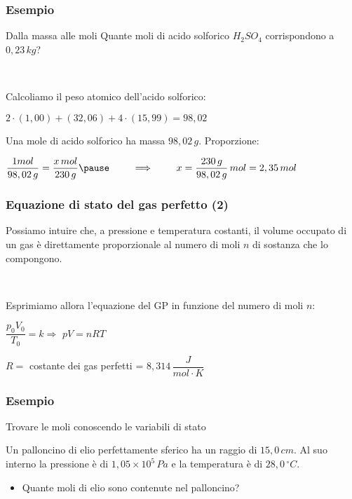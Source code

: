 \documentclass[]{beamer}
\theoremstyle{plain}
\begin{document}
\begin{frame}
\frametitle{Esempio}
\begin{exampleblock}{Dalla massa alle moli}
{\small Quante moli di acido solforico $ H_2SO_4 $ corrispondono a $ 0,23 \, kg $?}
\end{exampleblock}\pause

~

Calcoliamo il peso atomico dell'acido solforico:
\begin{center}
$ 2 \cdot (1,00) + (32,06) + 4 \cdot (15,99) = 98,02 $
\end{center}
Una mole di acido solforico ha massa $ 98,02 \, g $.{\pause} Proporzione:
\begin{center}
$ \dfrac{1 mol}{98,02 \, g} = \dfrac{x \, mol}{230 \, g} \pause ~~~~~~~ \Longrightarrow ~~~~~~~ x = \dfrac{230\, g}{98,02 \, g} \, mol = 2,35 \, mol $
\end{center}
\end{frame}

\begin{frame}
\frametitle{Equazione di stato del gas perfetto (2)}
Possiamo intuire che, a pressione e temperatura costanti, \alert<1>{il volume occupato di un gas è direttamente proporzionale al numero di moli} $ n $ di sostanza che lo compongono.\pause

~

Esprimiamo allora l'equazione del GP in funzione del numero di moli $ n $:
\begin{center}
$ \dfrac{p_0 V_0}{T_0} = k \Longrightarrow $ \colorbox{marroncino!30}{$ pV = nRT $}
\end{center}
$ R = $ costante dei gas perfetti = $ 8,314 \, \dfrac{J}{mol \cdot K} $
\end{frame}





\begin{frame}
\frametitle{Esempio}
\begin{exampleblock}{Trovare le moli conoscendo le variabili di stato}
{\small Un palloncino di elio perfettamente sferico ha un raggio di $ 15,0 \, cm $. Al suo interno la pressione è di $ 1,05 \times 10^5 \, Pa $ e la temperatura è di $ 28,0 \, ^\circ C $.
\begin{itemize}
  \item Quante moli di elio sono contenute nel palloncino?
\end{itemize}}
\end{exampleblock}
\end{frame}
\end{document}
